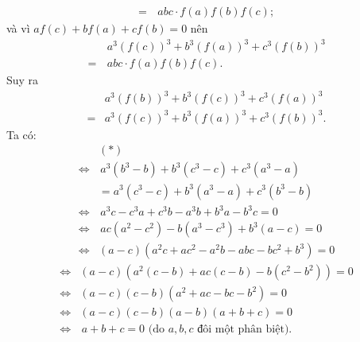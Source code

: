 \begin{multicols}{2}
\begin{align*}
		= \,&abc \cdot f\left( a \right)f\left( b \right)f\left( c \right);
	\end{align*}
	và vì $af\left( c \right) + bf\left( a \right) + cf\left( b \right) = 0$  nên 
	\begin{align*}
		&{a^3}{\left( {f\left( c \right)} \right)^3} + {b^3}{\left( {f\left( a \right)} \right)^3} + {c^3}{\left( {f\left( b \right)} \right)^3} \\[-0.5ex]
		=\,& abc \cdot f\left( a \right)f\left( b \right)f\left( c \right).
	\end{align*}
	Suy ra
	\begin{align*}
		&{a^3}{\left( {f\left( b \right)} \right)^3} + {b^3}{\left( {f\left( c \right)} \right)^3} + {c^3}{\left( {f\left( a \right)} \right)^3}\\[-0.5ex]
		 = &{a^3}{\left( {f\left( c \right)} \right)^3} + {b^3}{\left( {f\left( a \right)} \right)^3} + {c^3}{\left( {f\left( b \right)} \right)^3}.
	\end{align*}
	Ta có:
	\begin{align*}
		&(*) \\
		\Leftrightarrow&\, {a^3}\left( {{b^3} - b} \right) + {b^3}\left( {{c^3} - c} \right) + {c^3}\left( {{a^3} - a} \right) \\[-0.5ex]
		&= {a^3}( {{c^3} - c}) + {b^3}( {{a^3} - a} ) + {c^3}( {{b^3} - b})\\[-0.5ex]
		\Leftrightarrow&\, {a^3}c - {c^3}a + {c^3}b - {a^3}b + {b^3}a - {b^3}c = 0\\[-0.5ex]
		\Leftrightarrow&\, ac( {{a^2} \!-\! {c^2}} ) \!-\! b( {{a^3} \!-\! {c^3}}) \!+\! {b^3}( {a \!-\! c} ) \!=\! 0\\[-0.5ex]
		\Leftrightarrow& ( \!{a \!-\! c}\!)\!(\! {{a^2}c \!+\! a{c^2} \!-\! {a^2}b \!-\! abc \!-\! b{c^2} \!+\! {b^3}} \!) \!=\! 0
		\end{align*}
		\begin{align*}
		\Leftrightarrow &(\! {a \!-\! c}\!)\!(\! {a^2}( {c \!-\! b}\! ) \!+\! ac(\! {c \!-\! b} \!) \!-\! b(\! {{c^2} \!-\! {b^2}}\!)\!) \!=\! 0\\[-0.5ex]
		\Leftrightarrow& \left( {a - c} \right)\left( {c - b} \right)\left( {{a^2} + ac - bc - {b^2}} \right) = 0\\[-0.5ex]
		\Leftrightarrow& \left( {a - c} \right)\left( {c - b} \right)\left( {a - b} \right)\left( {a + b + c} \right) = 0\\[-0.5ex]
		\Leftrightarrow& \,a \!+\! b \!+\! c \!=\! 0 \text{ (do $a,b,c$ đôi một phân biệt).}
	\end{align*}

\end{multicols}
